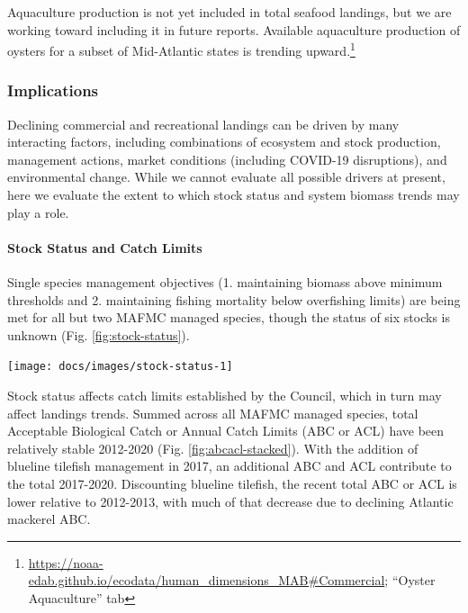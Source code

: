 \documentclass[
  10pt,
]{article}
\let\origfigure\figure
\let\endorigfigure\endfigure
\renewenvironment{figure}[1][2] {
    \expandafter\origfigure\expandafter[H]
} {
    \endorigfigure
}
\begin{document}
Aquaculture production is not yet included in total seafood landings,
but we are working toward including it in future reports. Available
aquaculture production of oysters for a subset of Mid-Atlantic states is
trending upward.\footnote{\url{https://noaa-edab.github.io/ecodata/human_dimensions_MAB\#Commercial};
  ``Oyster Aquaculture'' tab}

\hypertarget{implications}{%
\subsubsection{Implications}\label{implications}}

Declining commercial and recreational landings can be driven by many
interacting factors, including combinations of ecosystem and stock
production, management actions, market conditions (including COVID-19
disruptions), and environmental change. While we cannot evaluate all
possible drivers at present, here we evaluate the extent to which stock
status and system biomass trends may play a role.

\hypertarget{stock-status-and-catch-limits}{%
\paragraph{Stock Status and Catch
Limits}\label{stock-status-and-catch-limits}}

Single species management objectives (1. maintaining biomass above
minimum thresholds and 2. maintaining fishing mortality below
overfishing limits) are being met for all but two MAFMC managed species,
though the status of six stocks is unknown (Fig.
\ref{fig:stock-status}).

\begin{figure}

{\centering \texttt{[image: docs/images/stock-status-1]} 

}

\caption{Summary of single species status for MAFMC and jointly federally managed stocks (Spiny dogfish and both Goosefish). Stocks in green are below the biomass threshold (overfished), stocks in orange are above the biomass threshold but below the biomass target, and stocks in purple are above the biomass target. Only one stock, Atlantic mackerel, has fishing mortality above the limit (subject to overfishing).}\label{fig:stock-status}
\end{figure}

Stock status affects catch limits established by the Council, which in
turn may affect landings trends. Summed across all MAFMC managed
species, total Acceptable Biological Catch or Annual Catch Limits (ABC
or ACL) have been relatively stable 2012-2020 (Fig.
\ref{fig:abcacl-stacked}). With the addition of blueline tilefish
management in 2017, an additional ABC and ACL contribute to the total
2017-2020. Discounting blueline tilefish, the recent total ABC or ACL is
lower relative to 2012-2013, with much of that decrease due to declining
Atlantic mackerel ABC.
\end{document}
